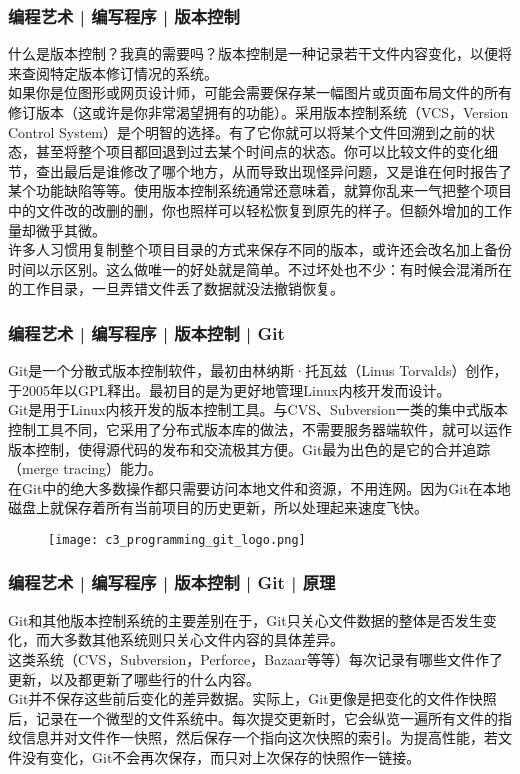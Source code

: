 \begin{frame}
  \frametitle{编程艺术 | 编写程序 | 版本控制}
  什么是版本控制？我真的需要吗？版本控制是一种记录若干文件内容变化，以便将来查阅特定版本修订情况的系统。\\
  \vspace{1em}
  如果你是位图形或网页设计师，可能会需要保存某一幅图片或页面布局文件的所有修订版本（这或许是你非常渴望拥有的功能）。采用版本控制系统（VCS，Version Control System）是个明智的选择。有了它你就可以将某个文件回溯到之前的状态，甚至将整个项目都回退到过去某个时间点的状态。你可以比较文件的变化细节，查出最后是谁修改了哪个地方，从而导致出现怪异问题，又是谁在何时报告了某个功能缺陷等等。使用版本控制系统通常还意味着，就算你乱来一气把整个项目中的文件改的改删的删，你也照样可以轻松恢复到原先的样子。但额外增加的工作量却微乎其微。\\
  \vspace{1em}
  许多人习惯用复制整个项目目录的方式来保存不同的版本，或许还会改名加上备份时间以示区别。这么做唯一的好处就是简单。不过坏处也不少：有时候会混淆所在的工作目录，一旦弄错文件丢了数据就没法撤销恢复。
\end{frame}

\begin{frame}
  \frametitle{编程艺术 | 编写程序 | 版本控制 | \alert{Git}}
  Git是一个\alert{分散式版本控制软件}，最初由\alert{林纳斯·托瓦兹（Linus Torvalds）}创作，于2005年以GPL释出。最初目的是为更好地管理Linux内核开发而设计。\\
  \vspace{0.5em}
Git是用于Linux内核开发的版本控制工具。与CVS、Subversion一类的集中式版本控制工具不同，它采用了\alert{分布式版本库}的做法，不需要服务器端软件，就可以运作版本控制，使得源代码的发布和交流极其方便。Git最为出色的是它的合并追踪（merge tracing）能力。\\
\vspace{0.5em}
在Git中的绝大多数操作都只需要访问本地文件和资源，不用连网。因为Git在本地磁盘上就保存着所有当前项目的历史更新，所以处理起来速度飞快。
\begin{figure}
  \centering
  \texttt{[image: c3\_programming\_git\_logo.png]}
\end{figure}
\end{frame}

\begin{frame}
  \frametitle{编程艺术 | 编写程序 | 版本控制 | Git | 原理}
Git和其他版本控制系统的主要差别在于，Git只关心文件数据的整体是否发生变化，而大多数其他系统则只关心文件内容的具体差异。\\
  \vspace{1em}
  这类系统（CVS，Subversion，Perforce，Bazaar等等）每次记录有哪些文件作了更新，以及都更新了哪些行的什么内容。\\
  \vspace{1em}
  Git并不保存这些前后变化的差异数据。实际上，Git更像是把变化的文件作快照后，记录在一个微型的文件系统中。每次提交更新时，它会纵览一遍所有文件的指纹信息并对文件作一快照，然后保存一个指向这次快照的索引。为提高性能，若文件没有变化，Git不会再次保存，而只对上次保存的快照作一链接。
\end{frame}

